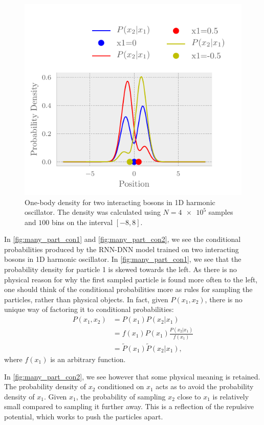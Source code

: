 \begin{figure}[H]
	\includegraphics[]{figures/many_part_con2.pdf}
	\caption{One-body density for two interacting bosons in 1D harmonic
      oscillator. The density was calculated using $N=\num{4e5}$ samples and $100$
      bins on the interval $[-8,8]$.} 
	\label{fig:many_part_con2}
\end{figure}

In \autoref{fig:many_part_con1} and \autoref{fig:many_part_con2}, we see the
conditional probabilities produced by the RNN-DNN model trained on two
interacting bosons in 1D harmonic oscillator. In \autoref{fig:many_part_con1},
we see that the probability density for particle 1 is skewed towards the left.
As there is no physical reason for why the first sampled particle is found more
often to the left, one should think of the conditional probabilities more as
rules for sampling the particles, rather than physical objects. In fact, given
$P(x_1, x_2)$, there is no unique way of factoring it to conditional
probabilities:  
\begin{align*}
	P(x_1, x_2) &= P(x_1)P(x_2|x_1)\\
                &= f(x_1)P(x_1)\frac{P(x_2|x_1)}{f(x_1)}\\
                &= \tilde{P}(x_1)\tilde{P}(x_2|x_1),
\end{align*}
where $f(x_1)$ is an arbitrary function. 

In \autoref{fig:many_part_con2}, we see however that some physical meaning is
retained. The probability density of \(x_{2}\) conditioned on \(x_{1}\)
acts as to avoid the probability density of \(x_{1}\). Given \(x_{1}\), the
probability of sampling \(x_{2}\) close to \(x_{1}\) is relatively small
compared to sampling it further away. This is a reflection of the repulsive
potential, which works to push the particles apart. 
 
